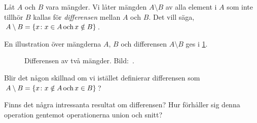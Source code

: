 \begin{definition}\label{def:Mangddifferens}
  Låt \(A\) och \(B\) vara mängder.
  Vi låter mängden \(A\setminus B\) av alla element i \(A\) som inte tillhör
  \(B\) kallas för \emph{differensen} mellan \(A\) och \(B\).
  Det vill säga, \(A\setminus B = \{x\colon x\in A\operatorname{och} x\notin B\}\).
\end{definition}
En illustration över mängderna \(A\), \(B\) och differensen \(A\setminus B\) 
ges i \cref{fig:Differens}.
\begin{figure}
  \caption{%
    Differensen av två mängder.
    Bild:~\cite{Wikipedia2013Set}.
  }\label{fig:Differens}
\end{figure}

\begin{exercise}
  Blir det någon skillnad om vi istället definierar differensen som 
  \(A\setminus B = \{x\colon x\notin A\operatorname{och} x\in B\}\)?
\end{exercise}
\begin{exercise}
  Finns det några intressanta resultat om differensen?
  Hur förhåller sig denna operation gentemot operationerna union och snitt?
\end{exercise}

